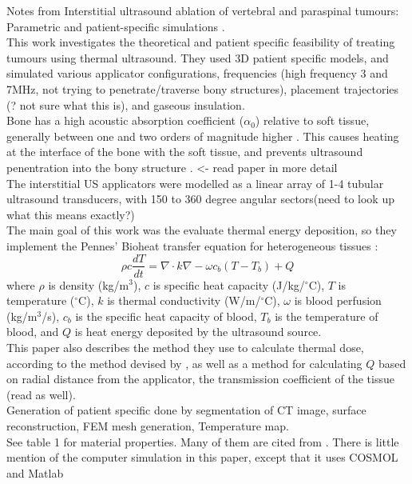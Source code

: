 \documentclass[11pt,titlepage]{article} %
\begin{document}
Notes from Interstitial ultrasound ablation of vertebral and paraspinal tumours: Parametric and patient-specific simulations \cite{scott2014interstitial}.\\
This work investigates the theoretical and patient specific feasibility of treating tumours using thermal ultrasound.
They used 3D patient specific models, and simulated various applicator configurations, frequencies (high frequency 3 and 7MHz, not trying to penetrate/traverse bony structures), placement trajectories (? not sure what this is), and gaseous insulation.\\
Bone has a high acoustic absorption coefficient ($\alpha_0$) relative to soft tissue, generally between one and two orders of magnitude higher \cite{duck1990physical}. This causes heating at the interface of the bone with the soft tissue, and prevents ultrasound penentration into the bony structure \cite{fujii1999study}. <- read paper in more detail\\
The interstitial US applicators were modelled as a linear array of 1-4 tubular ultrasound transducers, with 150 to 360 degree angular sectors(need to look up what this means exactly?)\\
The main goal of this work was the evaluate thermal energy deposition, so they implement the Pennes' Bioheat transfer equation for heterogeneous tissues \cite{pennes1948analysis}:
\begin{equation}
\rho c \frac{dT}{dt} = \nabla \cdot k \nabla - \omega c_b(T-T_b)+Q
\end{equation}
where $\rho$ is density (kg/m$^3$), $c$ is specific heat capacity (J/kg/$^{\circ}$C), $T$ is temperature ($^{\circ}$C), $k$ is thermal conductivity (W/m/$^{\circ}$C), $\omega$ is blood perfusion (kg/m$^3$/s), $c_b$ is the specific heat capacity of blood, $T_b$ is the temperature of blood, and $Q$ is heat energy deposited by the ultrasound source. \\
This paper also describes the method they use to calculate thermal dose, according to the method devised by \cite{sapareto1984thermal}, as well as a method for calculating $Q$ based on radial distance from the applicator, the transmission coefficient of the tissue (read \cite{scott2013interstitial} as well).\\
Generation of patient specific done by segmentation of CT image, surface reconstruction, FEM mesh generation, Temperature map.\\
See table 1 for material properties. Many of them are cited from \cite{duck1990physical}.
There is little mention of the computer simulation in this paper, except that it uses COSMOL and Matlab\\
\end{document}
